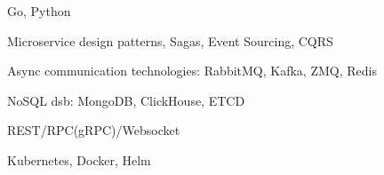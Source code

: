 \item Go, Python
\item Microservice design patterns, Sagas, Event Sourcing, CQRS
\item Async communication technologies: RabbitMQ, Kafka, ZMQ, Redis
\item NoSQL dsb: MongoDB, ClickHouse, ETCD
\item REST/RPC(gRPC)/Websocket
\item Kubernetes, Docker, Helm
